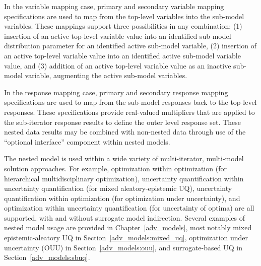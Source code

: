 In the variable mapping case, primary and secondary variable
mapping specifications are used to map from the top-level variables
into the sub-model variables.  These mappings support three
possibilities in any combination: (1) insertion of an active top-level
variable value into an identified sub-model distribution parameter for
an identified active sub-model variable, (2) insertion of an active
top-level variable value into an identified active sub-model variable
value, and (3) addition of an active top-level variable value as an
inactive sub-model variable, augmenting the active sub-model
variables.

In the response mapping case, primary and secondary response
mapping specifications are used to map from the sub-model responses
back to the top-level responses.  These specifications provide
real-valued multipliers that are applied to the sub-iterator response
results to define the outer level response set.  These nested data
results may be combined with non-nested data through use of the 
``optional interface'' component within nested models.

The nested model is used within a wide variety of multi-iterator,
multi-model solution approaches.  For example, optimization within
optimization (for hierarchical multidisciplinary optimization),
uncertainty quantification within uncertainty quantification (for
mixed aleatory-epistemic UQ), uncertainty quantification within
optimization (for optimization under uncertainty), and optimization
within uncertainty quantification (for uncertainty of optima) are all
supported, with and without surrogate model indirection.  Several
examples of nested model usage are provided in
Chapter~\ref{adv_models}, most notably mixed epistemic-aleatory UQ in
Section~\ref{adv_models:mixed_uq}, optimization under uncertainty
(OUU) in Section~\ref{adv_models:ouu}, and surrogate-based UQ in
Section~\ref{adv_models:sbuq}.
